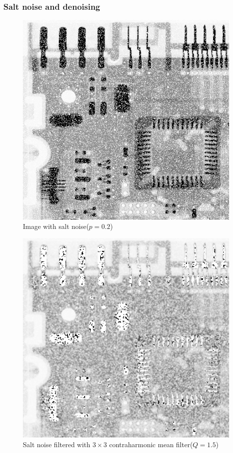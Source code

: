 \documentclass{article}
\begin{document}
\subsubsection[H]{Salt noise and denoising}


\begin{figure}[H]
	\centering
	\includegraphics[width=336pt]{../result/task2/salt/salt-20.png}
	\caption{Image with salt noise($p=0.2$)}
	\label{fig:salt}
\end{figure}

\begin{figure}[H]
	\centering
	\includegraphics[width=336pt]{../result/task2/salt/salt-contraharmonic-1-5.png}
	\caption{Salt noise filtered with $3 \times 3$ contraharmonic mean filter($Q = 1.5$)}
	\label{fig:saltchmpos}
\end{figure}
\end{document}
